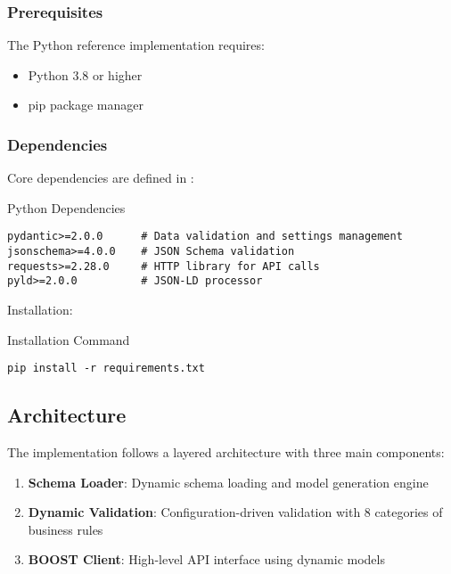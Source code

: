 \subsubsection{Prerequisites}
\label{sec:python-prerequisites}

The Python reference implementation requires:

\begin{itemize}
    \item Python 3.8 or higher
    \item pip package manager
\end{itemize}

\subsubsection{Dependencies}
\label{sec:python-dependencies}

Core dependencies are defined in :

\begin{pythonexample}{Python Dependencies}
\begin{verbatim}
pydantic>=2.0.0      # Data validation and settings management
jsonschema>=4.0.0    # JSON Schema validation  
requests>=2.28.0     # HTTP library for API calls
pyld>=2.0.0          # JSON-LD processor
\end{verbatim}
\end{pythonexample}

Installation:

\begin{pythonexample}{Installation Command}
\begin{verbatim}
pip install -r requirements.txt
\end{verbatim}
\end{pythonexample}

\subsection{Architecture}
\label{sec:python-architecture}

The implementation follows a layered architecture with three main components:

\begin{enumerate}
    \item \textbf{Schema Loader}: Dynamic schema loading and model generation engine
    \item \textbf{Dynamic Validation}: Configuration-driven validation with 8 categories of business rules
    \item \textbf{BOOST Client}: High-level API interface using dynamic models
\end{enumerate}

